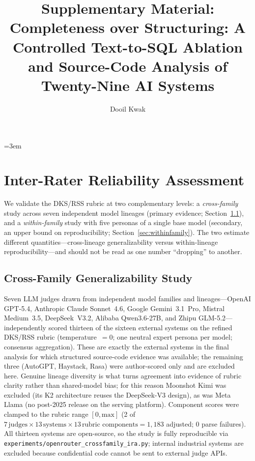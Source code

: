 \documentclass[10pt,a4paper]{article}
\title{Supplementary Material:\\Completeness over Structuring: A Controlled Text-to-SQL Ablation and Source-Code Analysis of Twenty-Nine AI Systems}
\author{Dooil Kwak}
\date{}
\begin{document}
\emergencystretch=3em
\maketitle

\tableofcontents
\newpage

\section{Inter-Rater Reliability Assessment}
\label{sec:interrater}

We validate the DKS/RSS rubric at two complementary levels: a \emph{cross-family} study across seven independent model lineages (primary evidence; Section~\ref{sec:crossfamily}), and a \emph{within-family} study with five personas of a single base model (secondary, an upper bound on reproducibility; Section~\ref{sec:withinfamily}). The two estimate different quantities---cross-lineage generalizability versus within-lineage reproducibility---and should not be read as one number ``dropping'' to another.

\subsection{Cross-Family Generalizability Study}
\label{sec:crossfamily}

Seven LLM judges drawn from independent model families and lineages---OpenAI GPT-5.4, Anthropic Claude Sonnet~4.6, Google Gemini~3.1~Pro, Mistral Medium~3.5, DeepSeek~V3.2, Alibaba Qwen3.6-27B, and Zhipu GLM-5.2---independently scored thirteen of the sixteen external systems on the refined DKS/RSS rubric (temperature~$=0$; one neutral expert persona per model; consensus aggregation). These are exactly the external systems in the final analysis for which structured source-code evidence was available; the remaining three (AutoGPT, Haystack, Rasa) were author-scored only and are excluded here. Genuine lineage diversity is what turns agreement into evidence of rubric clarity rather than shared-model bias; for this reason Moonshot Kimi was excluded (its K2 architecture reuses the DeepSeek-V3 design), as was Meta Llama (no post-2025 release on the serving platform). Component scores were clamped to the rubric range $[0,\text{max}]$ (2 of $7\,\text{judges}\times13\,\text{systems}\times13\,\text{rubric components}=1{,}183$ adjusted; 0 parse failures). All thirteen systems are open-source, so the study is fully reproducible via \texttt{experiments/openrouter\_crossfamily\_ira.py}; internal industrial systems are excluded because confidential code cannot be sent to external judge APIs.
\end{document}
